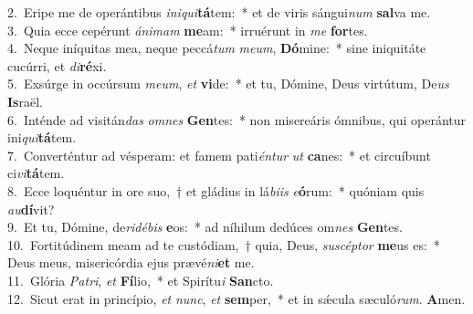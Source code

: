 {2.~}Eripe me de operántibus \textit{i}\textit{ni}\textit{qui}\textbf{tá}tem:~* et de viris sángui\textit{num} \textbf{sal}va me.\\
{3.~}Quia ecce cepérunt \textit{á}\textit{ni}\textit{mam} \textbf{me}am:~* irruérunt in \textit{me} \textbf{for}tes.\\
{4.~}Neque iníquitas mea, neque peccá\textit{tum} \textit{me}\textit{um}, \textbf{Dó}mine:~* sine iniquitáte cucúrri, et \textit{di}\textbf{ré}xi.\\
{5.~}Exsúrge in occúrsum \textit{me}\textit{um}, \textit{et} \textbf{vi}de:~* et tu, Dómine, Deus virtútum, De\textit{us} \textbf{Is}raël.\\
{6.~}Inténde ad visitán\textit{das} \textit{om}\textit{nes} \textbf{Gen}tes:~* non misereáris ómnibus, qui operántur ini\textit{qui}\textbf{tá}tem.\\
{7.~}Converténtur ad vésperam: et famem pati\textit{én}\textit{tur} \textit{ut} \textbf{ca}nes:~* et circuíbunt ci\textit{vi}\textbf{tá}tem.\\
{8.~}Ecce loquéntur in ore suo,~† et gládius in lá\textit{bi}\textit{is} \textit{e}\textbf{ó}rum:~* quóniam quis \textit{au}\textbf{dí}vit?\\
{9.~}Et tu, Dómine, de\textit{ri}\textit{dé}\textit{bis} \textbf{e}os:~* ad níhilum dedúces om\textit{nes} \textbf{Gen}tes.\\
{10.~}Fortitúdinem meam ad te custódiam,~† quia, Deus, \textit{su}\textit{scép}\textit{tor} \textbf{me}us es:~* Deus meus, misericórdia ejus prævé\textit{ni}\textbf{et} me.\\
{11.~}Glória \textit{Pa}\textit{tri}, \textit{et} \textbf{Fí}lio,~* et Spirítu\textit{i} \textbf{San}cto.\\
{12.~}Sicut erat in princípio, \textit{et} \textit{nunc}, \textit{et} \textbf{sem}per,~* et in sǽcula sæculó\textit{rum}. \textbf{A}men.\\
